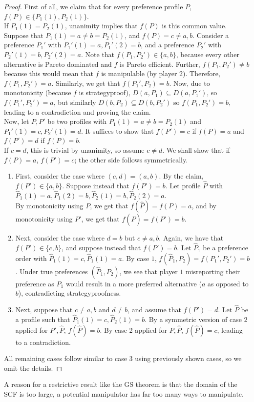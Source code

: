 	\begin{proof}
		First of all, we claim that for every preference profile $P$, $f(P) \in \{P_1(1),P_2(1)\}$.\\
		If $P_1(1) = P_2(1)$, unanimity implies that $f(P)$ is this common value.\\
		Suppose that $P_1(1) = a \ne b = P_2(1)$, and $f(P) = c \ne a,b$. Consider a preference $P_1'$ with $P_1'(1) = a, P_1'(2) = b$, and a preference $P_2'$ with $P_2'(1) = b, P_2'(2) = a$. Note that $f(P_1,P_2') \in \{a,b\}$, because every other alternative is Pareto dominated and $f$ is Pareto efficient. Further, $f(P_1,P_2') \ne b$ because this would mean that $f$ is manipulable (by player $2$). Therefore, $f(P_1,P_2') = a$.  Similarly, we get that $f(P_1',P_2) = b$. Now, due to monotonicity (because $f$ is strategyproof), $D(a,P_1) \subseteq D(a,P_1')$, so $f(P_1',P_2') = a$, but similarly $D(b,P_2) \subseteq D(b,P_2')$ so $f(P_1,P_2') = b$, leading to a contradiction and proving the claim.\\

		Now, let $P,P'$ be two profiles with $P_1(1) = a \ne b = P_2(1)$ and $P_1'(1) = c, P_2'(1) = d$. It suffices to show that $f(P') = c$ if $f(P) = a$ and $f(P') = d$ if $f(P) = b$.\\
		If $c = d$, this is trivial by unanimity, so assume $c \ne d$. We shall show that if $f(P) = a$, $f(P') = c$; the other side follows symmetrically.\\
		
		\begin{enumerate}
			\item First, consider the case where $(c,d) = (a,b)$. By the claim, $f(P') \in \{a,b\}$. Suppose instead that $f(P') = b$. Let profile $\hat{P}$ with $\hat{P}_1(1) = a, \hat{P}_1(2) = b, \hat{P}_2(1) = b, \hat{P}_2(2) = a$.\\
			By monotonicity using $P$, we get that $f(\hat{P}) = f(P) = a$, and by monotonicity using $P'$, we get that $f(\hat{P}) = f(P') = b$.

			\item Next, consider the case where $d = b$ but $c \ne a,b$. Again, we have that $f(P') \in \{c,b\}$, and suppose instead that $f(P') = b$. Let $\hat{P}_1$ be a preference order with $\hat{P}_1(1) = c, \hat{P}_1(1) = a$. By case $1$, $f(\hat{P}_1,P_2) = f(P_1',P_2') = b$. Under true preferences $(\hat{P}_1,P_2)$, we see that player $1$ misreporting their preference as $P_1$ would result in a more preferred alternative ($a$ as opposed to $b$), contradicting strategyproofness.

			\item Next, suppose that $c \ne a,b$ and $d \ne b$, and assume that $f(P') = d$. Let $\hat{P}$ be a profile such that $\hat{P}_1(1) = c, \hat{P}_2(1) = b$. By a symmetric version of case 2 applied for $P',\hat{P}$, $f(\hat{P}) = b$. By case 2 applied for $P,\hat{P}$, $f(\hat{P}) = c$, leading to a contradiction.
		\end{enumerate}
		All remaining cases follow similar to case 3 using previously shown cases, so we omit the details.
	\end{proof}

	A reason for a restrictive result like the GS theorem is that the domain of the SCF is too large, a potential manipulator has far too many ways to manipulate.